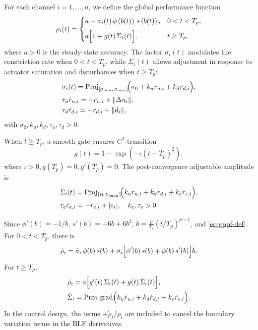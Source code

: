 \documentclass[pdflatex,sn-mathphys-num]{sn-jnl}%
\theoremstyle{thmstyleone}%
\theoremstyle{thmstyletwo}%
\theoremstyle{thmstylethree}%
\begin{document}
For each channel $i=1,\dots,n$, we define the global performance function
\begin{equation}\label{eq:gppf-def}
\rho_i(t)=
\begin{cases}
\displaystyle a + \sigma_i(t)\,\phi\left(b(t)\right)\,s\left(b(t)\right), & 0<t<T_p,\\[6pt]
\displaystyle a\Bigl[1 + g(t)\,\Sigma_i(t)\Bigr], & t\ge T_p,
\end{cases}
\end{equation}
where $a>0$ is the steady-state accuracy. The factor $\sigma_i(t)$ modulates the constriction rate when $0<t<T_p$, while $\Sigma_i(t)$ allows adjustment in response to actuator saturation and disturbances when $t \geq T_p $:
\begin{align}
&\sigma_i(t)=\operatorname{Proj}_{[\sigma_{\min},\,\sigma_{\max}]}\!\Bigl(\sigma_{0}+k_u r_{u,i}+k_d r_{d,i}\Bigr),\label{eq:gppf-sigma}\\
&\tau_u \dot r_{u,i}=-r_{u,i}+\|\Delta u_i\|,\\
  &\tau_d \dot r_{d,i}=-r_{d,i}+\|d_i\|, 
\end{align}
with $\sigma_{0},k_u,k_d,\tau_u,\tau_d>0$.

When $t \geq T_p $, a smooth gate ensures $C^1$ transition
\begin{equation}\label{eq:gppf-gate}
g(t)=1-\exp\!\left(-\iota (t-T_p)^2\right),
\end{equation}      
where $\iota>0, g(T_p)=0, g'(T_p)=0$. The post-convergence adjustable amplitude is
\begin{align}
&\Sigma_i(t)=\operatorname{Proj}_{[\,0,\,\Sigma_{\max}\,]}\!\Bigl(k_u r_{u,i}+k_d r_{d,i}+k_e r_{e,i}\Bigr),\label{eq:gppf-Sigma}\\
&\tau_e \dot r_{e,i}=-r_{e,i}+|e_i|, \quad k_e,\tau_e>0.\nonumber
\end{align}

Since $\phi'(b)=-1/b$, $s'(b)=-6b+6b^2$, $\dot b=\frac{p}{T_p}(t/T_p)^{p-1}$, and \cref{eq:gppf-def}. For $0<t<T_p$, there is
\begin{equation}\label{eq:gppf-drho-pre}
\dot\rho_i
= \dot\sigma_i\,\phi(b)\,s(b)
+ \sigma_i\Bigl[\phi'(b)\,s(b)+\phi(b)\,s'(b)\Bigr]\dot b.
\end{equation}
For $t\ge T_p$,
\begin{equation}\label{eq:gppf-drho-post}
	\begin{aligned}
		&\dot\rho_i
= a\Bigl[g'(t)\,\Sigma_i(t)+g(t)\,\dot\Sigma_i(t)\Bigr],\\
&\dot\Sigma_i=\text{Proj-grad}\Bigl(k_u\dot r_{u,i}+k_d\dot r_{d,i}+k_e\dot r_{e,i}\Bigr).
	\end{aligned}
\end{equation}
In the control design, the terms $+\dot\rho_i/\rho_i$ are included to cancel the boundary variation terms in the BLF derivatives.
\end{document}
